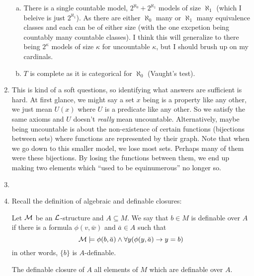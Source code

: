 \begin{enumerate}[1.]
\begin{enumerate}[a)]
  \item There is a single countable model, \(2^{\aleph_0} + 2^{\aleph_1}\) models of size \(\aleph_1\) (which I beleive is just \(2^{\aleph_1}\)). As there are either \(\aleph_0\) many or \(\aleph_1\) many equivalence classes and each can be of either size (with the one excpetion being countably many countable classes). I think this will generalize to there being \(2^\kappa\) models of size \(\kappa\) for uncountable \(\kappa\), but I should brush up on my cardinals.  
 
  \item \(T\) is complete as it is categorical for \(\aleph_0\) (Vaught's test).
\end{enumerate}

\item This is kind of a soft questions, so identifying what answers are sufficient is hard. At first glance, we might say a set \(x\) being is a property like any other, we just mean \(U(x)\) where \(U\) is a predicate like any other. So we satisfy the same axioms and \(U\) doesn't \textit{really} mean uncountable. Alternatively, maybe being uncountable is about the non-existence of certain functions (bijections between sets) where functions are represented by their graph.  Note that when we go down to this smaller model, we lose most sets. Perhaps many of them were these bijections. By losing the functions between them, we end up making two elements which ``used to be equinumerous'' no longer so. 
 
\item %

\item 
Recall the definition of algebraic and definable closures:

Let \(\mathcal{M}\) be an \(\mathcal{L}\)-structure and \(A \subseteq M\). 
We say that \(b \in M\) is definable over \(A\) if there is a formula \(\phi(v, \bar{w})\) and \(\bar{a} \in A\) such that
\[\mathcal{M} \models \phi(b, \bar{a}) \land \forall y (\phi(y, \bar{a}) \to y = b)\]
in other words, \(\{b\}\) is \(A\)-definable. 

The definable closure of \(A\) all elements of \(M\) which are definable over \(A\).


\end{enumerate}
